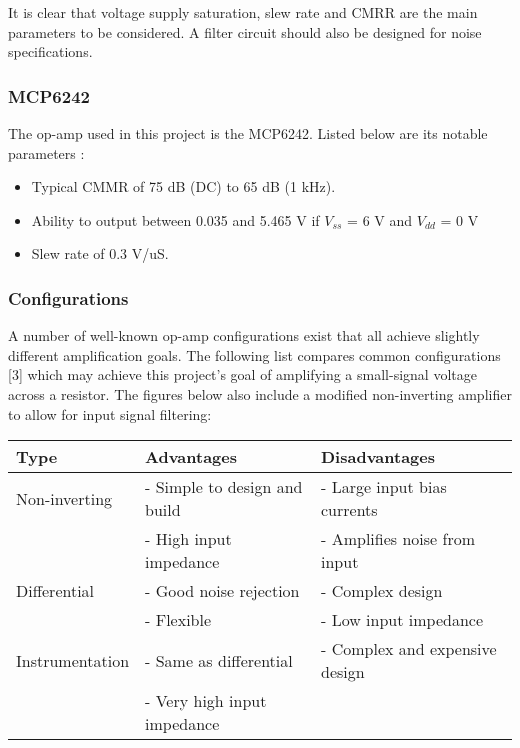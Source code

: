 It is clear that voltage supply saturation, slew rate and CMRR are the main parameters to be considered. A filter circuit should also be designed for noise specifications.

\subsubsection{MCP6242}\label{sec:opamps_MCP6242}
The op-amp used in this project is the MCP6242. Listed below are its notable parameters \cite{datasheetMCP6242}:
\begin{itemize}
    \item Typical CMMR of 75 dB (DC) to 65 dB (1 kHz).
    \item Ability to output between 0.035 and 5.465 V if $V_{ss}$ = 6 V and $V_{dd}$ = 0 V
    \item Slew rate of 0.3 V/uS.
\end{itemize}

\subsubsection{Configurations}\label{sec:opamps_configs}
A number of well-known op-amp configurations exist that all achieve slightly different amplification goals. The following list compares common configurations [3] which may achieve this project's goal
of amplifying a small-signal voltage across a resistor. The figures below also include a modified non-inverting amplifier to allow for input signal filtering:
\begin{center}

    \begin{tabular}{|p{3.5cm}|p{6cm}|p{6cm}|}
        \hline
        Type            & Advantages
                               & Disadvantages                               \\
        \hline
        Non-inverting   & - Simple to design and build                    & - Large input bias currents                 \\
                        & - High input impedance                          & - Amplifies noise from input                \\
        \hline
        Differential    & - Good noise rejection                          & - Complex design                            \\
                        & - Flexible                                      & - Low input impedance                       \\
        \hline
        Instrumentation & - Same as differential                          & - Complex and expensive design              \\
                        & - Very high input impedance                     &                                             \\
        \hline
    \end{tabular}
\end{center}

